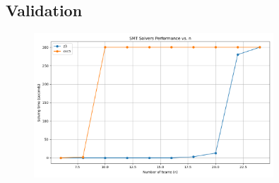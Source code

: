 \subsection{Validation}
\begin{figure}[h!]
  \centering
  \includegraphics[width=0.8\textwidth]{img/SMT-result.png}
  \caption{}
  \label{fig:output}
\end{figure}